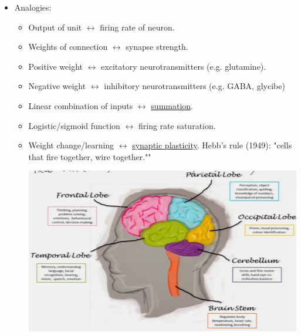 \documentclass[10pt]{article}
\begin{document}
\begin{itemize}
	\item Analogies:
		\begin{itemize}
			\item Output of unit $\leftrightarrow$ firing rate of neuron.
			\item Weights of connection $\leftrightarrow$ synapse strength.
			\item Positive weight $\leftrightarrow$ excitatory neurotransmitters (e.g. glutamine).
			\item Negative weight $\leftrightarrow$ inhibitory neurotransmitters (e.g. GABA, glycibe)
			\item Linear combination of inputs $\leftrightarrow$ \underline{summation}.
			\item Logistic/sigmoid function $\leftrightarrow$ firing rate saturation.
			\item Weight change/learning $\leftrightarrow$ \underline{synaptic plasticity}. Hebb's rule (1949): "cells that fire together, wire together.""
			\begin{center}
				\includegraphics[scale=0.5]{../images/brain}
			\end{center}
		\end{itemize}	
\end{itemize}
\end{document}
